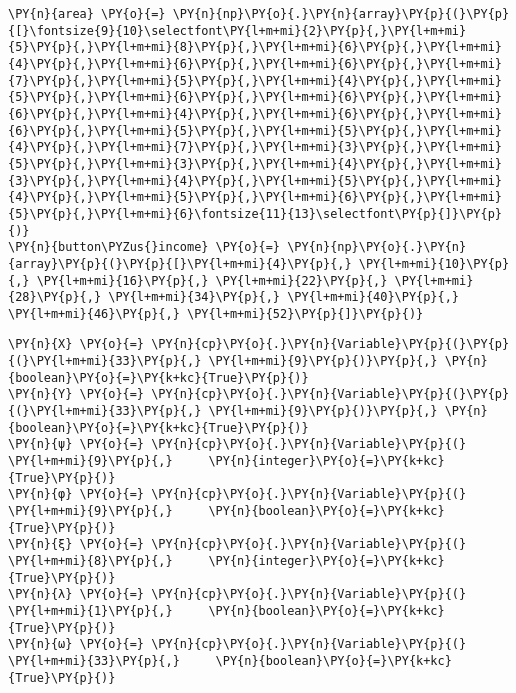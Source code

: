 \begin{tcolorbox}[breakable, size=fbox, boxrule=1pt, pad at break*=1mm,colback=cellbackground, colframe=cellborder]
\begin{Verbatim}[commandchars=\\\{\}]
\PY{n}{area} \PY{o}{=} \PY{n}{np}\PY{o}{.}\PY{n}{array}\PY{p}{(}\PY{p}{[}\fontsize{9}{10}\selectfont\PY{l+m+mi}{2}\PY{p}{,}\PY{l+m+mi}{5}\PY{p}{,}\PY{l+m+mi}{8}\PY{p}{,}\PY{l+m+mi}{6}\PY{p}{,}\PY{l+m+mi}{4}\PY{p}{,}\PY{l+m+mi}{6}\PY{p}{,}\PY{l+m+mi}{6}\PY{p}{,}\PY{l+m+mi}{7}\PY{p}{,}\PY{l+m+mi}{5}\PY{p}{,}\PY{l+m+mi}{4}\PY{p}{,}\PY{l+m+mi}{5}\PY{p}{,}\PY{l+m+mi}{6}\PY{p}{,}\PY{l+m+mi}{6}\PY{p}{,}\PY{l+m+mi}{6}\PY{p}{,}\PY{l+m+mi}{4}\PY{p}{,}\PY{l+m+mi}{6}\PY{p}{,}\PY{l+m+mi}{6}\PY{p}{,}\PY{l+m+mi}{5}\PY{p}{,}\PY{l+m+mi}{5}\PY{p}{,}\PY{l+m+mi}{4}\PY{p}{,}\PY{l+m+mi}{7}\PY{p}{,}\PY{l+m+mi}{3}\PY{p}{,}\PY{l+m+mi}{5}\PY{p}{,}\PY{l+m+mi}{3}\PY{p}{,}\PY{l+m+mi}{4}\PY{p}{,}\PY{l+m+mi}{3}\PY{p}{,}\PY{l+m+mi}{4}\PY{p}{,}\PY{l+m+mi}{5}\PY{p}{,}\PY{l+m+mi}{4}\PY{p}{,}\PY{l+m+mi}{5}\PY{p}{,}\PY{l+m+mi}{6}\PY{p}{,}\PY{l+m+mi}{5}\PY{p}{,}\PY{l+m+mi}{6}\fontsize{11}{13}\selectfont\PY{p}{]}\PY{p}{)}
\PY{n}{button\PYZus{}income} \PY{o}{=} \PY{n}{np}\PY{o}{.}\PY{n}{array}\PY{p}{(}\PY{p}{[}\PY{l+m+mi}{4}\PY{p}{,} \PY{l+m+mi}{10}\PY{p}{,} \PY{l+m+mi}{16}\PY{p}{,} \PY{l+m+mi}{22}\PY{p}{,} \PY{l+m+mi}{28}\PY{p}{,} \PY{l+m+mi}{34}\PY{p}{,} \PY{l+m+mi}{40}\PY{p}{,} \PY{l+m+mi}{46}\PY{p}{,} \PY{l+m+mi}{52}\PY{p}{]}\PY{p}{)}
    \end{Verbatim}
\end{tcolorbox}

\fontsize{10.95}{13.6}\selectfont

\begin{tcolorbox}[breakable, size=fbox, boxrule=1pt, pad at break*=1mm,colback=cellbackground, colframe=cellborder]
    \begin{Verbatim}[commandchars=\\\{\}]
\PY{n}{X} \PY{o}{=} \PY{n}{cp}\PY{o}{.}\PY{n}{Variable}\PY{p}{(}\PY{p}{(}\PY{l+m+mi}{33}\PY{p}{,} \PY{l+m+mi}{9}\PY{p}{)}\PY{p}{,} \PY{n}{boolean}\PY{o}{=}\PY{k+kc}{True}\PY{p}{)}
\PY{n}{Y} \PY{o}{=} \PY{n}{cp}\PY{o}{.}\PY{n}{Variable}\PY{p}{(}\PY{p}{(}\PY{l+m+mi}{33}\PY{p}{,} \PY{l+m+mi}{9}\PY{p}{)}\PY{p}{,} \PY{n}{boolean}\PY{o}{=}\PY{k+kc}{True}\PY{p}{)}
\PY{n}{ψ} \PY{o}{=} \PY{n}{cp}\PY{o}{.}\PY{n}{Variable}\PY{p}{(}  \PY{l+m+mi}{9}\PY{p}{,}     \PY{n}{integer}\PY{o}{=}\PY{k+kc}{True}\PY{p}{)}
\PY{n}{φ} \PY{o}{=} \PY{n}{cp}\PY{o}{.}\PY{n}{Variable}\PY{p}{(}  \PY{l+m+mi}{9}\PY{p}{,}     \PY{n}{boolean}\PY{o}{=}\PY{k+kc}{True}\PY{p}{)}
\PY{n}{ξ} \PY{o}{=} \PY{n}{cp}\PY{o}{.}\PY{n}{Variable}\PY{p}{(}  \PY{l+m+mi}{8}\PY{p}{,}     \PY{n}{integer}\PY{o}{=}\PY{k+kc}{True}\PY{p}{)}
\PY{n}{λ} \PY{o}{=} \PY{n}{cp}\PY{o}{.}\PY{n}{Variable}\PY{p}{(}  \PY{l+m+mi}{1}\PY{p}{,}     \PY{n}{boolean}\PY{o}{=}\PY{k+kc}{True}\PY{p}{)}
\PY{n}{ω} \PY{o}{=} \PY{n}{cp}\PY{o}{.}\PY{n}{Variable}\PY{p}{(} \PY{l+m+mi}{33}\PY{p}{,}     \PY{n}{boolean}\PY{o}{=}\PY{k+kc}{True}\PY{p}{)}
    \end{Verbatim}
\end{tcolorbox}

